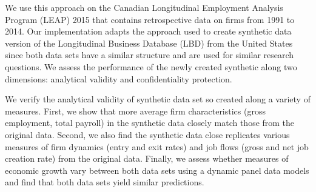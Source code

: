 \documentclass{article}
\begin{document}
We use this approach on the Canadian Longitudinal Employment Analysis Program (LEAP) 2015 that contains retrospective data on firms from 1991 to 2014. Our implementation adapts the approach used to create synthetic data version of the Longitudinal Business Database (LBD) from the United States since both data sets have a similar structure and are used for similar research questions. We assess the performance of the newly created synthetic along two dimensions: analytical validity and confidentiality protection.

We verify the analytical validity of synthetic data set so created along a variety of measures. First, we show that more average firm characteristics (gross employment, total payroll) in the synthetic data closely match those from the original data. Second, we also find the synthetic data close replicates various measures of firm dynamics (entry and exit rates) and job flows (gross and net job creation rate) from the original data. Finally, we assess whether measures of economic growth vary between both data sets using a dynamic panel data models and find that both data sets yield similar predictions.
\end{document}
